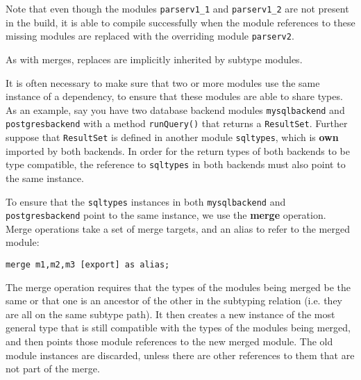 Note that even though the modules {\tt parserv1\_1} and {\tt parserv1\_2}
are not present in the build, it is able to compile successfully when the
module references to these missing modules are replaced with the overriding
module {\tt parserv2}.

As with merges, replaces are implicitly inherited by subtype modules.




It is often necessary to make sure that two or more modules use the same
instance of a dependency, to ensure that these
modules are able to share types. As an example, say you have two database
backend modules {\tt mysqlbackend} and {\tt postgresbackend} with a method
{\tt runQuery()} that returns a \texttt{ResultSet}. Further suppose that {\tt ResultSet} is
defined in another module {\tt sqltypes}, which is \textbf{own} imported by both backends.
In order for the return types of both backends to be type compatible, the
reference to {\tt sqltypes} in both backends must also point to the same
instance.

To ensure that the {\tt sqltypes} instances in both {\tt mysqlbackend}
and {\tt postgresbackend} point to the same instance, we use the 
\textbf{merge} operation. Merge operations take a set of merge targets,
and an alias to refer to the merged module:

\begin{lstlisting}
merge m1,m2,m3 [export] as alias;
\end{lstlisting}

The merge operation requires that the types
of the modules being merged be the same or that one is an ancestor of
the other in the subtyping relation (i.e. they are all on the same subtype path). 
It then creates a new instance
of the most general type that is still compatible with the types of the
modules being merged, and then points those module references to the new 
merged module. The old module instances are discarded, unless there
are other references to them that are not part of the merge.

